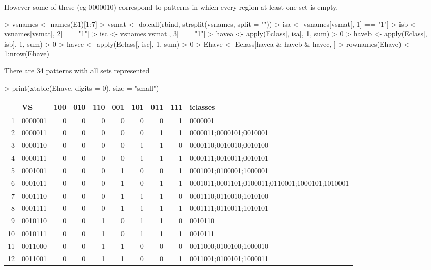 \documentclass[a4paper]{article}
\begin{document}
However some of these (eg 0000010) correspond to
patterns in which every region at least one set is empty.
\begin{Schunk}
\begin{Sinput}
> vsnames <- names(E1)[1:7]
> vsmat <- do.call(rbind, strsplit(vsnames, split = ""))
> isa <- vsnames[vsmat[, 1] == "1"]
> isb <- vsnames[vsmat[, 2] == "1"]
> isc <- vsnames[vsmat[, 3] == "1"]
> havea <- apply(Eclass[, isa], 1, sum) > 0
> haveb <- apply(Eclass[, isb], 1, sum) > 0
> havec <- apply(Eclass[, isc], 1, sum) > 0
> Ehave <- Eclass[havea & haveb & havec, ]
> rownames(Ehave) <- 1:nrow(Ehave)
\end{Sinput}
\end{Schunk}
There are 34 patterns with all sets
represented
\begin{Schunk}
\begin{Sinput}
> print(xtable(Ehave, digits = 0), size = "small")
\end{Sinput}
% latex table generated in R 2.6.0 by xtable 1.4-6 package
% Tue Jun 19 22:51:39 2007
\begin{table}[ht]
\begin{center}
{\small
\begin{tabular}{rlrrrrrrrl}
  \hline
 & VS & 100 & 010 & 110 & 001 & 101 & 011 & 111 & iclasses \\
  \hline
1 & 0000001 & 0 & 0 & 0 & 0 & 0 & 0 & 1 & 0000001 \\
  2 & 0000011 & 0 & 0 & 0 & 0 & 0 & 1 & 1 & 0000011;0000101;0010001 \\
  3 & 0000110 & 0 & 0 & 0 & 0 & 1 & 1 & 0 & 0000110;0010010;0010100 \\
  4 & 0000111 & 0 & 0 & 0 & 0 & 1 & 1 & 1 & 0000111;0010011;0010101 \\
  5 & 0001001 & 0 & 0 & 0 & 1 & 0 & 0 & 1 & 0001001;0100001;1000001 \\
  6 & 0001011 & 0 & 0 & 0 & 1 & 0 & 1 & 1 & 0001011;0001101;0100011;0110001;1000101;1010001 \\
  7 & 0001110 & 0 & 0 & 0 & 1 & 1 & 1 & 0 & 0001110;0110010;1010100 \\
  8 & 0001111 & 0 & 0 & 0 & 1 & 1 & 1 & 1 & 0001111;0110011;1010101 \\
  9 & 0010110 & 0 & 0 & 1 & 0 & 1 & 1 & 0 & 0010110 \\
  10 & 0010111 & 0 & 0 & 1 & 0 & 1 & 1 & 1 & 0010111 \\
  11 & 0011000 & 0 & 0 & 1 & 1 & 0 & 0 & 0 & 0011000;0100100;1000010 \\
  12 & 0011001 & 0 & 0 & 1 & 1 & 0 & 0 & 1 & 0011001;0100101;1000011 \\

\end{tabular}}
\end{center}
\end{table}
\end{Schunk}
\end{document}

